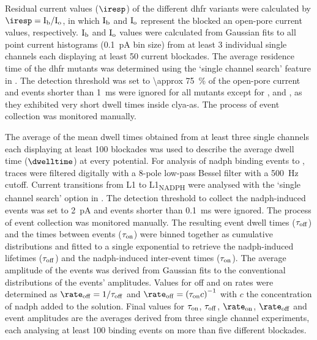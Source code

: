 Residual current values ($\iresp$) of the different \gls{dhfr} variants were calculated by $\iresp =
\rm{I}_b/\rm{I}_o$, in which $\rm{I}_b$ and $\rm{I}_o$ represent the blocked an open-pore current values,
respectively. $\rm{I}_b$ and $\rm{I}_o$ values were calculated from Gaussian fits to all point current
histograms (\SI{0.1}{\pA} bin size) from at least 3 individual single channels each displaying at least 50
current blockades. The average residence time of the \gls{dhfr} mutants was determined using the `single
channel search' feature in . The detection threshold was set to \SI{\approx 75}{\percent} of
the open-pore current and events shorter than \SI{1}{\ms} were ignored for all mutants except for ,
 and , as they exhibited very short dwell times inside \gls{clya-as}. The process of
event collection was monitored manually.

The average of the mean dwell times obtained from at least three single channels each displaying at least 100
blockades was used to describe the average dwell time ($\dwelltime$) at every potential. For analysis of
\gls{nadph} binding events to , traces were filtered digitally with a 8-pole low-pass Bessel
filter with a \SI{500}{\hertz} cutoff. Current transitions from L1 to L1\textsubscript{NADPH} were analysed
with the `single channel search' option in . The detection threshold to collect the
\gls{nadph}-induced events was set to \SI{2}{\pA} and events shorter than \SI{0.1}{\ms} were ignored. The
process of event collection was monitored manually. The resulting event dwell times ($\tau_{\rm{off}}$) and
the times between events ($\tau_{\rm{on}}$) were binned together as cumulative distributions and fitted to a
single exponential to retrieve the \gls{nadph}-induced lifetimes ($\tau_{\rm{off}}$) and the
\gls{nadph}-induced inter-event times ($\tau_{\rm{on}}$). The average amplitude of the events was derived from
Gaussian fits to the conventional distributions of the events' amplitudes. Values for off and on rates were
determined as $\rate_{\rm{off}} = 1/\tau_{\rm{off}}$ and $\rate_{\rm{off}} = \left(\tau_{\rm{on}} c
\right)^{-1}$ with $c$ the concentration of \gls{nadph} added to the \transi{} solution. Final values for
$\tau_{\rm{on}}$, $\tau_{\rm{off}}$, $\rate_{\rm{on}}$, $\rate_{\rm{off}}$ and event amplitudes are the
averages derived from three single channel experiments, each analysing at least 100 binding events on more
than five different  blockades.



\cleardoublepage

